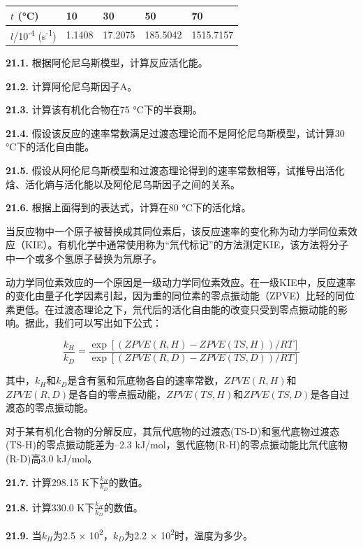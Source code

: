 \begin{longtable}[]{@{}lllll@{}}
	\toprule
	$t$ (°C) & 10 & 30 & 50 & 70\tabularnewline
	\midrule
	\endhead
	$l$/10\textsuperscript{-4} (s\textsuperscript{-1}) &
	1.1408 & 17.2075 & 185.5042 & 1515.7157\tabularnewline
	\bottomrule
\end{longtable}

\noindent\textbf{21.1.} 根据阿伦尼乌斯模型，计算反应活化能。

\noindent\textbf{21.2.} 计算阿伦尼乌斯因子A。

\noindent\textbf{21.3.} 计算该有机化合物在75 °C下的半衰期。

\noindent\textbf{21.4.}
假设该反应的速率常数满足过渡态理论而不是阿伦尼乌斯模型，试计算30
°C下的活化自由能。

\noindent\textbf{21.5.}
假设从阿伦尼乌斯模型和过渡态理论得到的速率常数相等，试推导出活化焓、活化熵与活化能以及阿伦尼乌斯因子之间的关系。

\noindent\textbf{21.6.} 根据上面得到的表达式，计算在80 °C下的活化焓。

当反应物中一个原子被替换成其同位素后，该反应速率的变化称为动力学同位素效应（KIE）。有机化学中通常使用称为``氘代标记''的方法测定KIE，该方法将分子中一个或多个氢原子替换为氘原子。

动力学同位素效应的一个原因是一级动力学同位素效应。在一级KIE中，反应速率的变化由量子化学因素引起，因为重的同位素的零点振动能（ZPVE）比轻的同位素更低。在过渡态理论之下，氘代后的活化自由能的改变只受到零点振动能的影响。据此，我们可以写出如下公式：

$$\frac{k_H}{k_D} = \frac{\exp[(ZPVE(R, H)-ZPVE(TS,H))/RT]}{\exp[(ZPVE(R, D)-ZPVE(TS, D))/RT]}$$

其中，\(k_H\)和\(k_D\)是含有氢和氘底物各自的速率常数，$ZPVE(R,
H)$和$ZPVE(R,D)$是各自的零点振动能，$ZPVE(TS, H)$和$ZPVE(TS,
D)$是各自过渡态的零点振动能。

对于某有机化合物的分解反应，其氘代底物的过渡态(TS-D)和氢代底物过渡态(TS-H)的零点振动能差为--2.3
kJ/mol，氢代底物(R-H)的零点振动能比氘代底物(R-D)高3.0 kJ/mol。

\noindent\textbf{21.7.} 计算298.15 K下\(\frac{k_H}{k_D}\)的数值。

\noindent\textbf{21.8.} 计算330.0 K下\(\frac{k_H}{k_D}\)的数值。

\noindent\textbf{21.9.} 当\(k_H\)为2.5 × 10\textsuperscript{2}，\(k_D\)为2.2 ×
10\textsuperscript{2}时，温度为多少。
